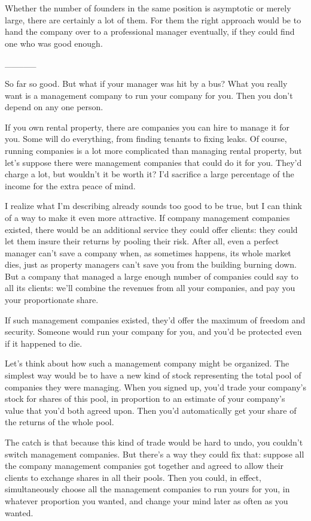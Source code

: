 Whether the number of founders in the same position is asymptotic or
merely large, there are certainly a lot of them. For them the right
approach would be to hand the company over to a professional manager
eventually, if they could find one who was good enough.

\_\_\_\_\_

So far so good. But what if your manager was hit by a bus? What you
really want is a management company to run your company for you. Then
you don't depend on any one person.

If you own rental property, there are companies you can hire to manage
it for you. Some will do everything, from finding tenants to fixing
leaks. Of course, running companies is a lot more complicated than
managing rental property, but let's suppose there were management
companies that could do it for you. They'd charge a lot, but wouldn't it
be worth it? I'd sacrifice a large percentage of the income for the
extra peace of mind.

I realize what I'm describing already sounds too good to be true, but I
can think of a way to make it even more attractive. If company
management companies existed, there would be an additional service they
could offer clients: they could let them insure their returns by pooling
their risk. After all, even a perfect manager can't save a company when,
as sometimes happens, its whole market dies, just as property managers
can't save you from the building burning down. But a company that
managed a large enough number of companies could say to all its clients:
we'll combine the revenues from all your companies, and pay you your
proportionate share.

If such management companies existed, they'd offer the maximum of
freedom and security. Someone would run your company for you, and you'd
be protected even if it happened to die.

Let's think about how such a management company might be organized. The
simplest way would be to have a new kind of stock representing the total
pool of companies they were managing. When you signed up, you'd trade
your company's stock for shares of this pool, in proportion to an
estimate of your company's value that you'd both agreed upon. Then you'd
automatically get your share of the returns of the whole pool.

The catch is that because this kind of trade would be hard to undo, you
couldn't switch management companies. But there's a way they could fix
that: suppose all the company management companies got together and
agreed to allow their clients to exchange shares in all their pools.
Then you could, in effect, simultaneously choose all the management
companies to run yours for you, in whatever proportion you wanted, and
change your mind later as often as you wanted.

